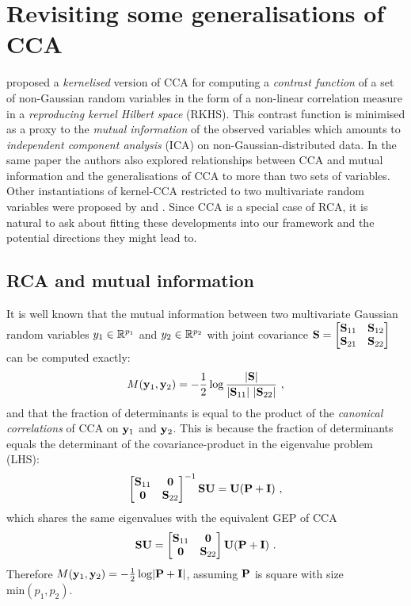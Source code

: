 
        
  \section{Revisiting some generalisations of CCA} \label{sec:chap4_generalisingCCA}
  
    \citet{Bach:kica02} proposed a \textit{kernelised} version of CCA for computing a \textit{contrast function} of a set of non-Gaussian random variables in the form of a non-linear correlation measure in a \textit{reproducing kernel Hilbert space} (RKHS). This contrast function is minimised as a proxy to the \textit{mutual information} of the observed variables which amounts to \textit{independent component analysis} (ICA) on non-Gaussian-distributed data. In the same paper the authors also explored relationships between CCA and mutual information and the generalisations of CCA to more than two sets of variables. Other instantiations of kernel-CCA restricted to two multivariate random variables were proposed by \citet{Lai:kernelcca00} and \citet{Akaho:kernel01}. Since CCA is a special case of RCA, it is natural to ask about fitting these developments into our framework and the potential directions they might lead to.

     \subsection{RCA and mutual information}
     
	It is well known that the mutual information between two multivariate Gaussian random variables $y_1 \in \mathbb{R}^{p_1}$ and $y_2 \in \mathbb{R}^{p_2}$ with joint covariance $\mathbf{S} = \begin{bmatrix}  \mathbf{S}_{11} &\mathbf{S}_{12} \\ \mathbf{S}_{21} & \mathbf{S}_{22} \end{bmatrix}$ can be computed exactly:
	\[
	  M(\mathbf{y}_1, \mathbf{y}_2) = - \frac{1}{2} \log \frac{\lvert  \mathbf{S} \rvert }{ \lvert \mathbf{S}_{11} \rvert ~ \lvert \mathbf{S}_{22} \rvert } ~,
	\]
	and that the fraction of determinants is equal to the product of the \emph{canonical correlations} of CCA on $\mathbf{y}_1$ and $\mathbf{y}_2$. This is because the fraction of determinants equals the determinant of the covariance-product in the eigenvalue problem (LHS):
	\begin{align*}
	  \begin{bmatrix}  \mathbf{S}_{11} &\mathbf{0} \\ \mathbf{0} &\mathbf{S}_{22}  \end{bmatrix}^{-1} \mathbf{S} \mathbf{U} = \mathbf{U} ( \mathbf{P} + \mathbf{I}) ~,
	\end{align*}
	which shares the same eigenvalues with the equivalent GEP of CCA
	\begin{align*}
	  \mathbf{S} \mathbf{U} = \begin{bmatrix}  \mathbf{S}_{11} &\mathbf{0} \\ \mathbf{0} &\mathbf{S}_{22}  \end{bmatrix} \mathbf{U} ( \mathbf{P} + \mathbf{I}) ~.
	\end{align*}
	Therefore $M(\mathbf{y}_1, \mathbf{y}_2) = - \frac{1}{2} \log \lvert \mathbf{P + \mathbf{I}} \rvert$, assuming $\mathbf{P}$ is square with size $\textrm{min}(p_1,p_2)$.

